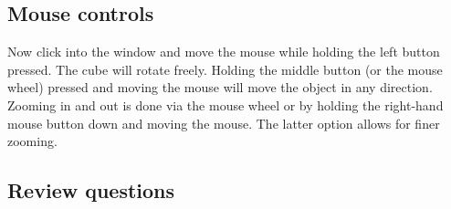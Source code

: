 \documentclass{article}
\begin{document}
\subsection{Mouse controls}

Now click into the window and move the mouse while holding the left
button pressed. The cube will rotate freely. Holding the middle
button (or the mouse wheel) pressed and moving the mouse will move the 
object in any direction. Zooming in and out is done via the mouse wheel 
or by holding the right-hand mouse button down and moving the mouse.
The latter option allows for finer zooming.

\subsection{Review questions}
\end{document}

